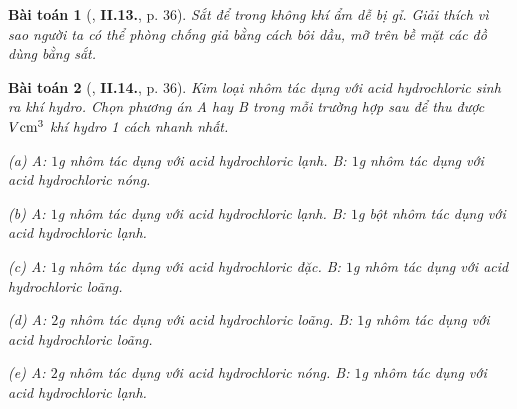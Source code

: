 \documentclass{article}
\numberwithin{equation}{section}
\newtheorem{baitoan}{Bài toán}
\begin{document}
\begin{baitoan}[\cite{Truong2021}, \textbf{II.13.}, p. 36]
	Sắt để trong không khí ẩm dễ bị gỉ. Giải thích vì sao người ta có thể phòng chống giả bằng cách bôi dầu, mỡ trên bề mặt các đồ dùng bằng sắt.
\end{baitoan}

\begin{baitoan}[\cite{Truong2021}, \textbf{II.14.}, p. 36]
	Kim loại nhôm tác dụng với acid hydrochloric sinh ra khí hydro. Chọn phương án A hay B trong mỗi trường hợp sau để thu được $V{\rm cm}^3$ khí hydro 1 cách nhanh nhất.
	\begin{enumerate*}
		\item[(a)] A: $1$\emph{g} nhôm tác dụng với acid hydrochloric lạnh. B: $1$\emph{g} nhôm tác dụng với acid hydrochloric nóng.
		\item[(b)] A: $1$\emph{g} nhôm tác dụng với acid hydrochloric lạnh. B: $1$\emph{g} bột nhôm tác dụng với acid hydrochloric lạnh.
		\item[(c)] A: $1$\emph{g} nhôm tác dụng với acid hydrochloric đặc. B: $1$\emph{g} nhôm tác dụng với acid hydrochloric loãng.
		\item[(d)] A: $2$\emph{g} nhôm tác dụng với acid hydrochloric loãng. B: $1$\emph{g} nhôm tác dụng với acid hydrochloric loãng.
		\item[(e)] A: $2$\emph{g} nhôm tác dụng với acid hydrochloric nóng. B: $1$\emph{g} nhôm tác dụng với acid hydrochloric lạnh.
	\end{enumerate*}
\end{baitoan}
\end{document}
